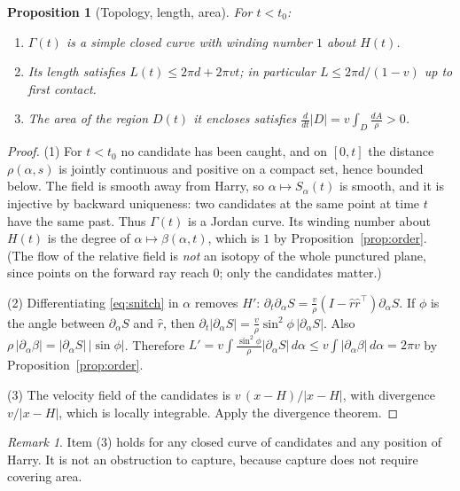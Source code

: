 \documentclass[11pt]{article}
\newtheorem{proposition}{Proposition}
\theoremstyle{remark}\newtheorem{remark}{Remark}
\newcommand{\rhat}{\hat r}
\begin{document}
\begin{proposition}[Topology, length, area]\label{prop:length}
For $t<t_0$:
\begin{enumerate}
\item $\Gamma(t)$ is a simple closed curve with winding number $1$ about $H(t)$.
\item Its length satisfies $L(t)\le 2\pi d+2\pi v t$; in particular $L\le 2\pi d/(1-v)$ up to first contact.
\item The area of the region $D(t)$ it encloses satisfies $\frac{d}{dt}|D|=v\int_{D}\frac{dA}{\rho}>0$.
\end{enumerate}
\end{proposition}
\begin{proof}
(1) For $t<t_0$ no candidate has been caught, and on $[0,t]$ the distance $\rho(\alpha,s)$ is jointly continuous and
positive on a compact set, hence bounded below. The field is smooth away from Harry, so $\alpha\mapsto S_\alpha(t)$ is smooth,
and it is injective by backward uniqueness: two candidates at the same point at time $t$ have the same past. Thus $\Gamma(t)$ is
a Jordan curve. Its winding number about $H(t)$ is the degree of $\alpha\mapsto\beta(\alpha,t)$, which is $1$ by
Proposition~\ref{prop:order}. (The flow of the relative field is \emph{not} an isotopy of the whole punctured plane, since
points on the forward ray reach $0$; only the candidates matter.)

(2) Differentiating \eqref{eq:snitch} in $\alpha$ removes $H'$:
$\partial_t\partial_\alpha S=\frac{v}{\rho}(I-\rhat\rhat^{\!\top})\partial_\alpha S$. If $\phi$ is the angle between
$\partial_\alpha S$ and $\rhat$, then $\partial_t|\partial_\alpha S|=\frac{v}{\rho}\sin^2\!\phi\,|\partial_\alpha S|$.
Also $\rho\,|\partial_\alpha\beta|=|\partial_\alpha S|\,|\sin\phi|$. Therefore
$L'=v\int\frac{\sin^2\phi}{\rho}|\partial_\alpha S|\,d\alpha\le v\int|\partial_\alpha\beta|\,d\alpha=2\pi v$
by Proposition~\ref{prop:order}.

(3) The velocity field of the candidates is $v\,(x-H)/|x-H|$, with divergence $v/|x-H|$, which is locally integrable.
Apply the divergence theorem.
\end{proof}
\begin{remark}
Item (3) holds for any closed curve of candidates and any position of Harry. It is not an obstruction to capture,
because capture does not require covering area.
\end{remark}
\end{document}
